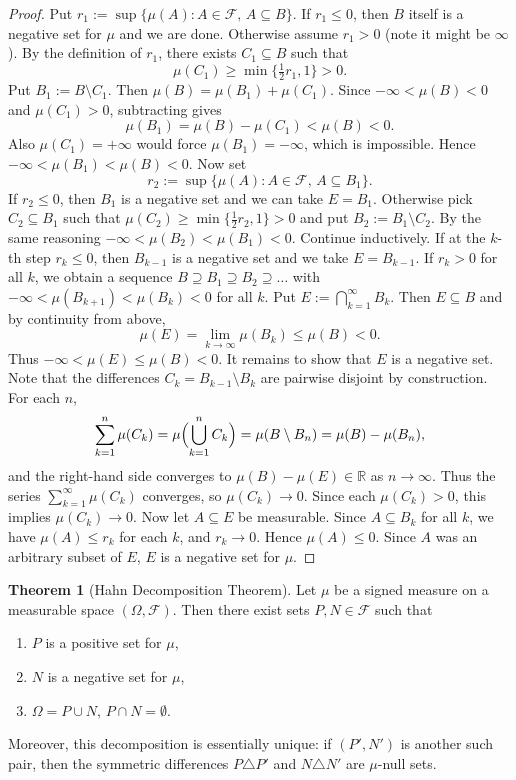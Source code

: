 \documentclass[11pt,a4paper]{article}
\theoremstyle{definition}
\newtheorem{theorem}{Theorem}[section]
\begin{document}
\begin{proof}
Put $r_1:=\sup\{\mu(A):A\in\mathcal{F},\,A\subseteq B\}$.  If $r_1\le0$, then $B$ itself is a negative set for $\mu$ and we are done.  Otherwise assume $r_1>0$ (note it might be $\infty$).  By the definition of $r_1$, there exists $C_1\subseteq B$ such that 
\[
\mu(C_1)\ge \min\{\tfrac12 r_1,1\} > 0.
\]
Put $B_1:=B\setminus C_1$.  Then $\mu(B)=\mu(B_1)+\mu(C_1)$.  Since $-\infty<\mu(B)<0$ and $\mu(C_1)>0$, subtracting gives
\[
\mu(B_1) = \mu(B) - \mu(C_1) < \mu(B) < 0.
\]
Also $\mu(C_1)=+\infty$ would force $\mu(B_1)=-\infty$, which is impossible.  Hence $-\infty<\mu(B_1)<\mu(B)<0$.  Now set 
\[
r_2 := \sup\{\mu(A):A\in\mathcal{F},\,A\subseteq B_1\}.
\]
If $r_2\le0$, then $B_1$ is a negative set and we can take $E=B_1$.  Otherwise pick $C_2\subseteq B_1$ such that $\mu(C_2)\ge \min\{\tfrac12 r_2,1\}>0$ and put $B_2:=B_1\setminus C_2$.  By the same reasoning $-\infty<\mu(B_2)<\mu(B_1)<0$.  Continue inductively.  If at the $k$-th step $r_k\le0$, then $B_{k-1}$ is a negative set and we take $E=B_{k-1}$.  If $r_k>0$ for all $k$, we obtain a sequence $B\supseteq B_1\supseteq B_2\supseteq \ldots$ with $-\infty<\mu(B_{k+1})<\mu(B_k)<0$ for all $k$.  Put $E:=\bigcap_{k=1}^\infty B_k$.  Then $E\subseteq B$ and by continuity from above,
\[
\mu(E) = \lim_{k\to\infty} \mu(B_k) \le \mu(B) < 0.
\]
Thus $-\infty<\mu(E)\le \mu(B)<0$.  It remains to show that $E$ is a negative set.  Note that the differences $C_k = B_{k-1}\setminus B_k$ are pairwise disjoint by construction.  For each $n$, 
\[
\sum_{k=1}^n \mu(C_k) = \mu\Bigl(\bigcup_{k=1}^n C_k\Bigr) = \mu(B\setminus B_n)
= \mu(B)-\mu(B_n),
\]
and the right-hand side converges to $\mu(B)-\mu(E)\in\mathbb{R}$ as $n\to\infty$.  Thus the series $\sum_{k=1}^\infty \mu(C_k)$ converges, so $\mu(C_k)\to0$.  Since each $\mu(C_k)>0$, this implies $\mu(C_k)\to0$.  Now let $A\subseteq E$ be measurable.  Since $A\subseteq B_k$ for all $k$, we have $\mu(A)\le r_k$ for each $k$, and $r_k\to0$.  Hence $\mu(A)\le0$.  Since $A$ was an arbitrary subset of $E$, $E$ is a negative set for $\mu$.  
\end{proof}

\begin{theorem}[Hahn Decomposition Theorem]
Let $\mu$ be a signed measure on a measurable space $(\Omega,\mathcal{F})$.  Then there exist sets $P,N\in\mathcal{F}$ such that
\begin{enumerate}
\item $P$ is a positive set for $\mu$,
\item $N$ is a negative set for $\mu$,
\item $\Omega = P \cup N$, $P\cap N=\emptyset$.
\end{enumerate}
Moreover, this decomposition is essentially unique: if $(P',N')$ is another such pair, then the symmetric differences $P\triangle P'$ and $N\triangle N'$ are $\mu$-null sets.
\end{theorem}
\end{document}
